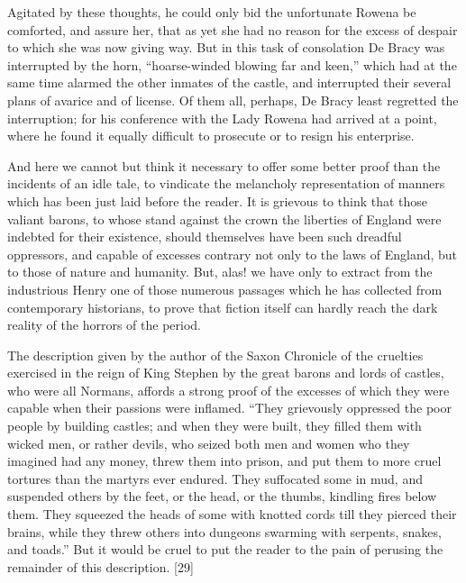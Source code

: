 Agitated by these thoughts, he could only bid the unfortunate Rowena be
comforted, and assure her, that as yet she had no reason for the excess
of despair to which she was now giving way. But in this task of
consolation De Bracy was interrupted by the horn, ``hoarse-winded
blowing far and keen,'' which had at the same time alarmed the other
inmates of the castle, and interrupted their several plans of avarice
and of license. Of them all, perhaps, De Bracy least regretted the
interruption; for his conference with the Lady Rowena had arrived at a
point, where he found it equally difficult to prosecute or to resign his
enterprise.

And here we cannot but think it necessary to offer some better proof
than the incidents of an idle tale, to vindicate the melancholy
representation of manners which has been just laid before the reader. It
is grievous to think that those valiant barons, to whose stand against
the crown the liberties of England were indebted for their existence,
should themselves have been such dreadful oppressors, and capable of
excesses contrary not only to the laws of England, but to those of
nature and humanity. But, alas! we have only to extract from the
industrious Henry one of those numerous passages which he has collected
from contemporary historians, to prove that fiction itself can hardly
reach the dark reality of the horrors of the period.

The description given by the author of the Saxon Chronicle of the
cruelties exercised in the reign of King Stephen by the great barons and
lords of castles, who were all Normans, affords a strong proof of the
excesses of which they were capable when their passions were inflamed.
``They grievously oppressed the poor people by building castles; and
when they were built, they filled them with wicked men, or rather
devils, who seized both men and women who they imagined had any money,
threw them into prison, and put them to more cruel tortures than the
martyrs ever endured. They suffocated some in mud, and suspended others
by the feet, or the head, or the thumbs, kindling fires below them. They
squeezed the heads of some with knotted cords till they pierced their
brains, while they threw others into dungeons swarming with serpents,
snakes, and toads.'' But it would be cruel to put the reader to the pain
of perusing the remainder of this description. {[}29{]}

